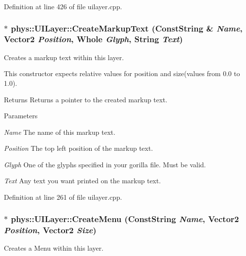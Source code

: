 Definition at line 426 of file uilayer.cpp.

\hypertarget{classphys_1_1UILayer_ac3f8812430c9b4f04cae996297e59377}{
\subsubsection[{CreateMarkupText}]{ $\ast$ phys::UILayer::CreateMarkupText ({\bf ConstString} \& {\em Name}, \/  {\bf Vector2} {\em Position}, \/  {\bf Whole} {\em Glyph}, \/  {\bf String} {\em Text})}}
\label{da/d48/classphys_1_1UILayer_ac3f8812430c9b4f04cae996297e59377}


Creates a markup text within this layer. 

This constructor expects relative values for position and size(values from 0.0 to 1.0). \begin{DoxyReturn}{Returns}
Returns a pointer to the created markup text. 
\end{DoxyReturn}

\begin{DoxyParams}{Parameters}
\item[{\em Name}]The name of this markup text. \item[{\em Position}]The top left position of the markup text. \item[{\em Glyph}]One of the glyphs specified in your gorilla file. Must be valid. \item[{\em Text}]Any text you want printed on the markup text. \end{DoxyParams}


Definition at line 261 of file uilayer.cpp.

\hypertarget{classphys_1_1UILayer_abd620dfec955b4f2403ccb038a60f88f}{
\subsubsection[{CreateMenu}]{ $\ast$ phys::UILayer::CreateMenu ({\bf ConstString} {\em Name}, \/  {\bf Vector2} {\em Position}, \/  {\bf Vector2} {\em Size})}}
\label{da/d48/classphys_1_1UILayer_abd620dfec955b4f2403ccb038a60f88f}


Creates a Menu within this layer. 

